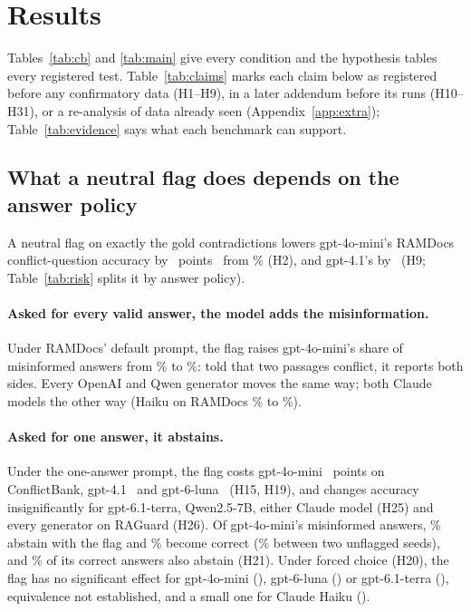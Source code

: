 \section{Results}
\label{sec:results}

Tables~\ref{tab:cb} and \ref{tab:main} give every condition and the hypothesis tables every registered test.
Table~\ref{tab:claims} marks each claim below as registered before any confirmatory data (H1--H9), in a later addendum before its
runs (H10--H31), or a re-analysis of data already seen (Appendix~\ref{app:extra});
Table~\ref{tab:evidence} says what each benchmark can support.

\subsection{What a neutral flag does depends on the answer policy}
\label{sec:neutral}


A neutral flag on exactly the gold contradictions lowers gpt-4o-mini's RAMDocs conflict-question accuracy
by \adOracleFlagConf\ points \dOracleFlagConfCI\ from \plainConf\% (H2), and gpt-4.1's by \agptOracleFlagConf\ (H9; Table~\ref{tab:risk} splits it by answer policy).

\paragraph{Asked for every valid answer, the model adds the misinformation.} Under RAMDocs' default prompt,
the flag raises gpt-4o-mini's share of
misinformed answers from \zmRdMiniPlainWrong\% to \zmRdMiniOracleFlagWrong\%: told that two
passages conflict, it reports both sides. Every OpenAI and Qwen generator moves the same way; both Claude models
the other way (Haiku on RAMDocs \zmRdHaikuPlainWrong\% to \zmRdHaikuOracleFlagWrong\%).

\paragraph{Asked for one answer, it abstains.} Under the one-answer prompt, the
flag costs gpt-4o-mini \azSgMiniOracleFlagConflict\ points on ConflictBank, gpt-4.1 \azSgFourOracleFlagConflict\ and
gpt-6-luna \azSgLunaOracleFlagConflict\ (H15, H19), and changes accuracy insignificantly for gpt-6.1-terra,
Qwen2.5-7B, either Claude model (H25) and every generator on RAGuard (H26). Of gpt-4o-mini's misinformed answers, \trSgMiniNeutralMisinfoAbstain\% abstain with the flag and
\trSgMiniNeutralMisinfoCorrect\% become correct (\trNullSgMiniMisinfoCorrect\% between two unflagged seeds), and \trSgMiniNeutralCorrectAbstain\% of its
correct answers also abstain (H21). Under forced choice (H20), the flag has no
significant effect for gpt-4o-mini (\hTwentyFcMiniFlag), gpt-6-luna (\hTwentyFcLunaFlag) or gpt-6.1-terra
(\hTwentyFcTerraFlag), equivalence not established, and a small one for Claude Haiku (\hTwentyFcHaikuFlag).

